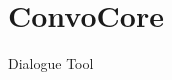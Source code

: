 \chapter{Convo\+Core }
\hypertarget{md__r_e_a_d_m_e}{}\label{md__r_e_a_d_m_e}
\label{md__r_e_a_d_m_e_autotoc_md0}%
%


Dialogue Tool 